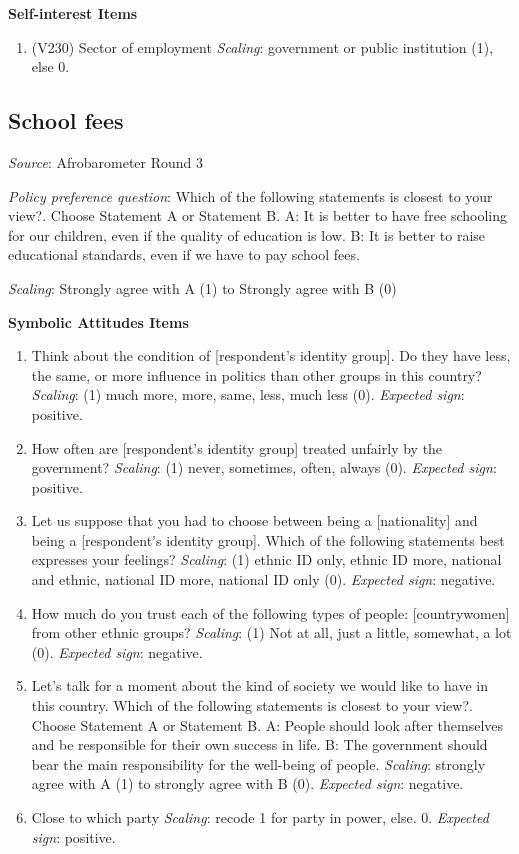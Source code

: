 \documentclass[]{article}
\begin{document}
\textbf{Self-interest Items }

\begin{enumerate}
 \item (V230) Sector of employment \textit{Scaling}: government or public institution (1), else 0.
\end{enumerate}

\subsection{School fees}\label{school-fees}

\textit{Source}: Afrobarometer Round 3

\textit{Policy preference question}: Which of the following statements
is closest to your view?. Choose Statement A or Statement B. A: It is
better to have free schooling for our children, even if the quality of
education is low. B: It is better to raise educational standards, even
if we have to pay school fees.

\textit{Scaling}: Strongly agree with A (1) to Strongly agree with B (0)

\textbf{Symbolic Attitudes Items}

\begin{enumerate}
  \item Think about the condition of [respondent’s identity group]. Do they have less, the same, or more influence in politics than other groups in this country? \textit{Scaling}: (1) much more, more, same, less, much less (0).  \textit{Expected sign}: positive.
  \item How often are [respondent’s identity group] treated unfairly by the government? \textit{Scaling}: (1) never, sometimes, often, always (0).  \textit{Expected sign}: positive.
  \item Let us suppose that you had to choose between being a [nationality] and being a [respondent’s identity group]. Which of the following statements best expresses your feelings? \textit{Scaling}: (1) ethnic ID only, ethnic ID more, national and ethnic, national ID more, national ID only (0).  \textit{Expected sign}: negative.
  \item How much do you trust each of the following types of people: [countrywomen] from other ethnic groups? \textit{Scaling}: (1) Not at all, just a little, somewhat, a lot (0).  \textit{Expected sign}: negative.
  \item Let’s talk for a moment about the kind of society we would like to have in this country. Which of the following statements is closest to your view?. Choose Statement A or Statement B. A: People should look after themselves and be responsible for their own success in life. B: The government should bear the main responsibility for the well-being of people. \textit{Scaling}: strongly agree with A (1) to strongly agree with B (0).  \textit{Expected sign}: negative.
  \item Close to which party \textit{Scaling}: recode 1 for party in power, else.  0. \textit{Expected sign}: positive.
\end{enumerate}
\end{document}
